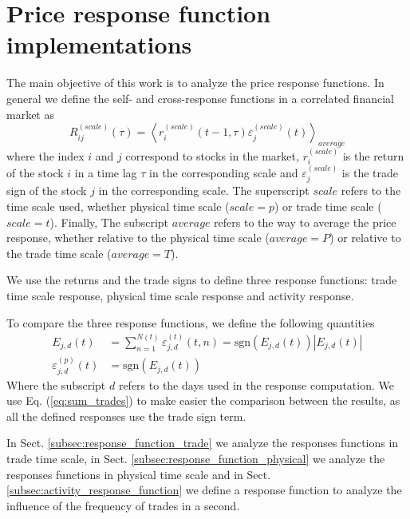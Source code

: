 \section{Price response function implementations}
\label{sec:response_functions_imp}

The main objective of this work is to analyze the price response functions. In
general we define the self- and cross-response functions in a correlated
financial market as
\begin{equation}\label{eq:response_general}
    R^{\left(scale\right)}_{ij}\left(\tau\right)=\left\langle
    r^{\left(scale\right)}_{i}\left(t-1, \tau\right)
    \varepsilon^{\left(scale\right)}_{j} \left(t\right)\right\rangle_{average}
\end{equation}
where the index $i$ and $j$ correspond to stocks in the market,
$r^{\left(scale\right)}_{i}$ is the return of the stock $i$ in a time lag
$\tau$ in the corresponding scale and $\varepsilon^{\left(scale\right)}_{j}$ is
the trade sign of the stock $j$ in the corresponding scale. The superscript
$scale$ refers to the time scale used, whether physical time scale
($scale = p$) or trade time scale ($scale = t$). Finally, The subscript
$average$ refers to the way to average the price response, whether relative to
the physical time scale ($average = P$) or relative to the trade time scale
($average = T$).

We use the returns and the trade signs to define three response functions:
trade time scale response, physical time scale response and activity response.

To compare the three response functions, we define the following quantities
\begin{align}
    E_{j,d}\left(t\right)&=\sum_{n=1}^{N\left(t\right)}
    \varepsilon_{j,d}^{\left(t\right)}\left(t,n\right) =
    \text{sgn}\left(E_{j,d}\left(t\right)\right)
    \left|E_{j,d}\left(t\right)\right|\label{eq:sum_trades}\\
    \varepsilon_{j,d}^{\left(p\right)}\left(t\right)&=
    \text{sgn}\left(E_{j,d}\left(t\right)\right)\label{eq:sign_sum_trades}
\end{align}
Where the subscript $d$ refers to the days used in the response computation.
We use Eq. (\ref{eq:sum_trades}) to make easier the comparison between the
results, as all the defined responses use the trade sign term.

In Sect. \ref{subsec:response_function_trade} we analyze the responses
functions in trade time scale, in Sect. \ref{subsec:response_function_physical}
we analyze the responses functions in physical time scale and in Sect.
\ref{subsec:activity_response_function} we define a response function to
analyze the influence of the frequency of trades in a second.

